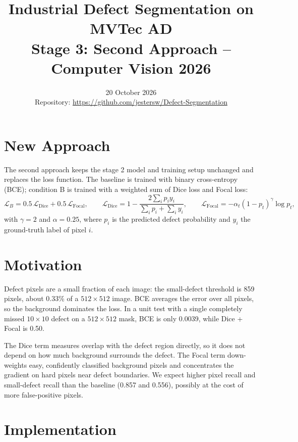 \documentclass[11pt,a4paper]{article}
\title{\textbf{Industrial Defect Segmentation on MVTec AD}\\[2pt]\large Stage 3: Second Approach -- Computer Vision 2026}
\date{20 October 2026\\[2pt]\small Repository: \url{https://github.com/jestersw/Defect-Segmentation}}
\begin{document}
\maketitle
\vspace{-1.5em}

\section{New Approach}

The second approach keeps the stage 2 model and training setup unchanged and replaces the loss function. The baseline is trained with binary cross-entropy (BCE); condition B is trained with a weighted sum of Dice loss and Focal loss:
\[
\mathcal{L}_{B} = 0.5\,\mathcal{L}_{\text{Dice}} + 0.5\,\mathcal{L}_{\text{Focal}}, \qquad
\mathcal{L}_{\text{Dice}} = 1 - \frac{2\sum_i p_i y_i}{\sum_i p_i + \sum_i y_i}, \qquad
\mathcal{L}_{\text{Focal}} = -\alpha_t (1 - p_t)^{\gamma} \log p_t ,
\]
with $\gamma = 2$ and $\alpha = 0.25$, where $p_i$ is the predicted defect probability and $y_i$ the ground-truth label of pixel $i$.

\section{Motivation}

Defect pixels are a small fraction of each image: the small-defect threshold is 859 pixels, about 0.33\% of a $512\times512$ image. BCE averages the error over all pixels, so the background dominates the loss. In a unit test with a single completely missed $10\times10$ defect on a $512\times512$ mask, BCE is only 0.0039, while Dice + Focal is 0.50.

The Dice term measures overlap with the defect region directly, so it does not depend on how much background surrounds the defect. The Focal term down-weights easy, confidently classified background pixels and concentrates the gradient on hard pixels near defect boundaries. We expect higher pixel recall and small-defect recall than the baseline (0.857 and 0.556), possibly at the cost of more false-positive pixels.

\section{Implementation}
\end{document}
